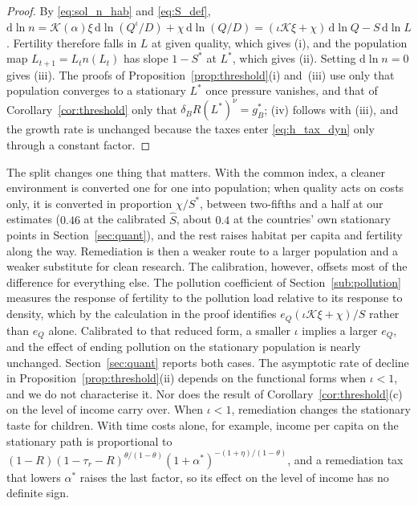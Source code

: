 \documentclass[11pt]{article}
\begin{document}
\begin{proof}
By \eqref{eq:sol_n_hab} and \eqref{eq:S_def}, $\mathrm{d}\ln n=\mathcal{K}(\alpha)\xi\,
\mathrm{d}\ln(Q^{\iota}/D)+\chi\,\mathrm{d}\ln(Q/D)=(\iota\mathcal{K}\xi+\chi)\,\mathrm{d}\ln Q-S\,\mathrm{d}\ln L$.
Fertility therefore falls in $L$ at given quality, which gives (i), and the population map
$L_{t+1}=L_tn(L_t)$ has slope $1-S^\ast$ at $L^\ast$, which gives (ii). Setting $\mathrm{d}\ln n=0$ gives (iii).
The proofs of Proposition~\ref{prop:threshold}(i) and~(iii) use only that population converges to a
stationary $L^\ast$ once pressure vanishes, and that of Corollary~\ref{cor:threshold} only that
$\delta_BR(L^\ast)^{\nu}=g_B^\ast$; (iv) follows with (iii), and the growth rate is unchanged because the
taxes enter \eqref{eq:h_tax_dyn} only through a constant factor.
\end{proof}

The split changes one thing that matters. With the common index, a cleaner environment is converted
one for one into population; when quality acts on costs only, it is converted in proportion
$\chi/S^\ast$, between two-fifths and a half at our estimates ($0.46$ at the calibrated $\hat S$, about
$0.4$ at the countries' own stationary points in Section~\ref{sec:quant}), and the rest raises habitat per capita and fertility
along the way. Remediation is then a weaker route to a larger population and a weaker substitute for clean
research. The calibration, however, offsets most of the difference for everything else. The pollution
coefficient of Section~\ref{sub:pollution} measures the response of fertility to the pollution load
relative to its response to density, which by the calculation in the proof identifies
$e_Q(\iota\mathcal{K}\xi+\chi)/S$ rather than $e_Q$ alone. Calibrated to that reduced form, a smaller
$\iota$ implies a larger $e_Q$, and the effect of ending pollution on the stationary population is
nearly unchanged. Section~\ref{sec:quant} reports both cases. The asymptotic rate of decline in
Proposition~\ref{prop:threshold}(ii) depends on the functional forms when $\iota<1$, and we do not
characterise it. Nor does the result of Corollary~\ref{cor:threshold}(c) on the level of income carry
over. When $\iota<1$, remediation changes the stationary taste for children. With time costs alone, for
example, income per capita on the stationary path is proportional to
$(1-R)(1-\tau_r-R)^{\theta/(1-\theta)}(1+\alpha^\ast)^{-(1+\eta)/(1-\theta)}$, and a remediation tax that
lowers $\alpha^\ast$ raises the last factor, so its effect on the level of income has no definite sign.
\end{document}
